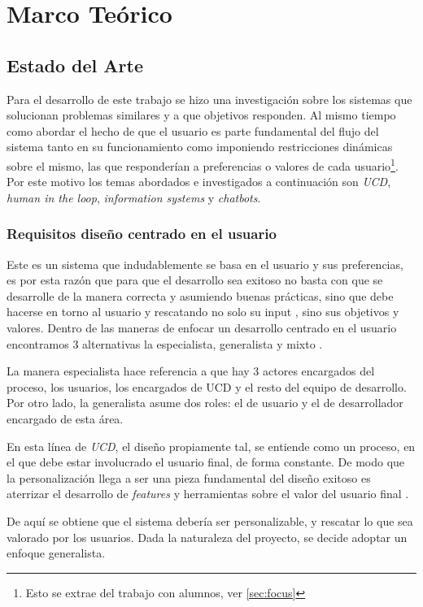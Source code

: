 \chapter{Marco Teórico}\label{mt}
\section{Estado del Arte}
    \par Para el desarrollo de este trabajo se hizo una investigación sobre los sistemas que solucionan problemas similares y a que objetivos responden. Al mismo tiempo como abordar el hecho de que el usuario es parte fundamental del flujo del sistema tanto en su funcionamiento como imponiendo restricciones dinámicas sobre el mismo, las que responderían a preferencias o valores de cada usuario\footnote{Esto se extrae del trabajo con alumnos, ver \ref{sec:focus}}. Por este motivo los temas abordados e investigados a continuación son \textit{\acrfull{UCD}}, \textit{human in the loop}, \textit{information systems} y \textit{chatbots}.
    
    \subsection{Requisitos diseño centrado en el usuario}
    \par Este es un sistema que indudablemente se basa en el usuario y sus preferencias, es por esta razón que para que el desarrollo sea exitoso no basta con que se desarrolle de la manera correcta y asumiendo buenas prácticas, sino que debe hacerse en torno al usuario y rescatando no solo su input \cite{Karat1997}, sino sus objetivos y valores. Dentro de las maneras de enfocar un desarrollo centrado en el usuario encontramos 3 alternativas la especialista, generalista y mixto \cite{Fox2008}.
    \par La manera especialista hace referencia a que hay 3 actores encargados del proceso, los usuarios, los encargados de \acrshort{UCD} y el resto del equipo de desarrollo. Por otro lado, la generalista asume dos roles: el de usuario y el de desarrollador encargado de esta área.
    \par En esta línea de \textit{\acrlong{UCD}}, el diseño propiamente tal, se entiende como un proceso, en el que debe estar involucrado el usuario final, de forma constante.
    De modo que la personalización llega a ser \guillemotleft una pieza fundamental del diseño exitoso es aterrizar el desarrollo de \textit{features} y herramientas sobre el valor del usuario final \guillemotright \cite{Kramer2000}.
    \par De aquí se obtiene que el sistema debería ser personalizable, y rescatar lo que sea valorado por los usuarios. Dada la naturaleza del proyecto, se decide adoptar un enfoque generalista.
    
